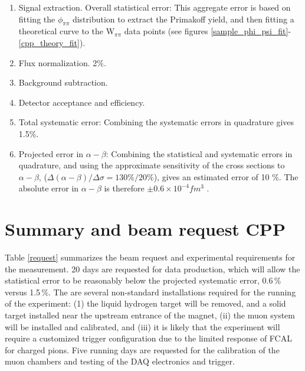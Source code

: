 \begin{enumerate}

\item
Signal extraction.
Overall statistical error:  This aggregate error is based on fitting the $\phi_{\pi \pi}$ distribution to
extract the Primakoff yield, and then fitting a theoretical curve to the W$_{\pi \pi}$ data points (see figures \ref{sample_phi_psi_fit}-\ref{cpp_theory_fit}).

\item
Flux normalization. 2\%.

\item
Background subtraction.

\item
Detector acceptance and efficiency.

\item
Total systematic error: Combining the systematic errors in quadrature gives 1.5\%.

\item
Projected error in $\alpha - \beta$: Combining the statistical and systematic errors in quadrature,  and using the approximate sensitivity of the
cross sections to $\alpha - \beta$, ($\Delta(\alpha - \beta)/\Delta \sigma = 130\% /20\%$), gives an estimated error of 10 \%.  The absolute 
error in $\alpha -\beta$ is therefore $\pm 0.6 \times 10^{-4} fm^3$ . 

\end{enumerate}

\section{Summary and beam request CPP}

Table \ref{request} summarizes the beam request and experimental requirements for the measurement.  20 days are requested for
data production, which  will allow the statistical error to be reasonably below the projected systematic
error, 0.6\,\% versus 1.5\,\%.  The are several non-standard installations required for the running of the
experiment: (1) the liquid hydrogen target will be  removed, and a solid target installed near the upstream
entrance of the magnet, (ii) the muon system will be installed and calibrated, and (iii) it is likely that the experiment
will require a customized trigger  configuration due to the limited  response of FCAL for charged pions.  
Five running  days are requested for the calibration of the muon chambers and testing of the DAQ electronics and trigger. 

